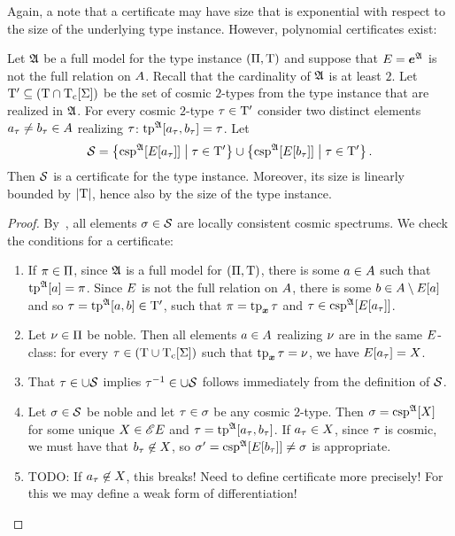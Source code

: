 Again, a note that a certificate may have size that is exponential with respect
to the size of the underlying type instance. However, polynomial certificates
exist:

\begin{lemma} Let $\mathfrak{A}$ be a full model for the type
instance $(\Pi,\mathrm{T})$ and suppose that $E = \bm{e}^{\mathfrak{A}}$ is not the full
relation on $A$. Recall that the cardinality of $\mathfrak{A}$ is at least $2$.
Let ${\mathrm{T}'} \subseteq (\mathrm{T} \cap \mathrm{T}_{\mathrm{c}}[\mathrm{\Sigma}])$ be the set of cosmic $2$-types
from the type instance that are realized in $\mathfrak{A}$. For every cosmic $2$-type
$\tau \in {\mathrm{T}'}$ consider two distinct elements $a_\tau \neq b_\tau \in
A$ realizing $\tau$: $\operatorname{tp}^{\mathfrak{A}}[a_\tau,b_\tau] = \tau$.
Let
\[
  \mathcal{S} = \left\{\operatorname{csp}^{\mathfrak{A}}[E[a_\tau]]\mathrel{}\middle|\mathrel{}\tau \in {\mathrm{T}'}\right\} \cup
  \left\{\operatorname{csp}^{\mathfrak{A}}[E[b_\tau]]\mathrel{}\middle|\mathrel{}\tau \in {\mathrm{T}'}\right\}.
\]
Then $\mathcal{S}$ is a certificate for the type instance. Moreover, its size is
linearly bounded by $\left|\mathrm{T}\right|$, hence also by the size of the type instance.
\end{lemma}
\begin{proof}
By~, all elements $\sigma \in \mathcal{S}$ are
locally consistent cosmic spectrums. We check the conditions for a certificate:
\begin{enumerate}
  \item If $\pi \in \Pi$, since $\mathfrak{A}$ is a full model for
  $(\Pi,\mathrm{T})$, there is some $a \in A$ such that $\operatorname{tp}^{\mathfrak{A}}[a] =
  \pi$. Since $E$ is not the full relation on $A$, there is some $b
  \in A \setminus E[a]$ and so $\tau = \operatorname{tp}^{\mathfrak{A}}[a,b] \in {\mathrm{T}'}$, such
  that $\pi = \operatorname{tp}_{\bm{x}}\tau$ and $\tau \in \operatorname{csp}^{\mathfrak{A}}[E[a_\tau]]$.
  \item Let $\nu \in \Pi$ be noble. Then all elements $a \in A$
  realizing $\nu$ are in the same $E$-class: for every $\tau \in (\mathrm{T}
  \cup \mathrm{T}_{\mathrm{c}}[\mathrm{\Sigma}])$ such that $\operatorname{tp}_{\bm{x}}\tau = \nu$, we have $E[a_\tau] =
  X$.
  \item That $\tau \in \cup\mathcal{S}$ implies $\tau^{-1} \in \cup\mathcal{S}$ follows
  immediately from the definition of $\mathcal{S}$.
  \item Let $\sigma \in \mathcal{S}$ be noble and let $\tau \in \sigma$ be any cosmic
  $2$-type. Then $\sigma = \operatorname{csp}^{\mathfrak{A}}[X]$ for some unique $X \in
  {\mathscr{E}E}$ and $\tau = \operatorname{tp}^{\mathfrak{A}}[a_\tau,b_\tau]$. If $a_\tau \in X$, since
  $\tau$ is cosmic, we must have that $b_\tau \not\in X$, so
  $\sigma' = \operatorname{csp}^{\mathfrak{A}}[E[b_\tau]] \neq \sigma$ is appropriate.
  \item TODO: If $a_\tau \not\in X$, this breaks! Need to define
  certificate more precisely! For this we may define a weak form of
  differentiation!
\end{enumerate}
\end{proof}

